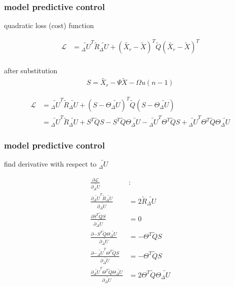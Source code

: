 \documentclass{beamer}
\begin{document}
\begin{frame}
  
  \frametitle{\bf model predictive control}

  quadratic loss (cost) function

  \begin{align*}
    \mathcal{L} &= \tilde{_\Delta U}^T \tilde{R} \tilde{_\Delta U} 
                + (\tilde{X_r} - \tilde{X})^T \tilde{Q} (\tilde{X_r} - \tilde{X})^T \\
  \end{align*}

  after substitution
  \begin{align*}
    S = \tilde{X_r} - \Psi\tilde{X} - \Omega u(n-1)
  \end{align*}


  \begin{align*}
    \mathcal{L} &= \tilde{_\Delta U}^T \tilde{R} \tilde{_\Delta U} + (S -  \Theta \tilde{_\Delta U} )^T \tilde{Q} (S -  \Theta \tilde{_\Delta U} ) \\
                &= \tilde{_\Delta U}^T \tilde{R} \tilde{_\Delta U} 
                + S^T\tilde{Q}S - S^T \tilde{Q} \Theta \tilde{_\Delta U} 
                - \tilde{_\Delta U}^T \Theta^T\tilde{Q}S + \tilde{_\Delta U}^T\Theta^T\tilde{Q}\Theta\tilde{_\Delta U}
  \end{align*}

\end{frame}



\begin{frame}
  
  \frametitle{\bf model predictive control}

  find derivative with respect to $\tilde{_\Delta U}$ 

  \begin{align*}
    \frac{\partial \mathcal{L}}{\partial {\tilde{_\Delta U}}} & : \\
    \frac{\partial {\tilde{_\Delta U}^T \tilde{R} \tilde{_\Delta U} } }{\partial {\tilde{_\Delta U}}} & = 2\tilde{R}\tilde{_\Delta U} \\
    \frac{\partial {S^T\tilde{Q}S}}{\partial {\tilde{_\Delta U}}} & = 0 \\
    \frac{\partial {- S^T \tilde{Q} \Theta \tilde{_\Delta U} }}{\partial {\tilde{_\Delta U}}} & = -\Theta^T\tilde{Q}S \\
    \frac{\partial {- \tilde{_\Delta U}^T \Theta^T\tilde{Q}S}}{\partial {\tilde{_\Delta U}}} & = -\Theta^T\tilde{Q}S \\
    \frac{\partial { \tilde{_\Delta U}^T\Theta^T\tilde{Q}\Theta\tilde{_\Delta U}}}{\partial {\tilde{_\Delta U}}} & = 2\Theta^T\tilde{Q}\Theta\tilde{_\Delta U}
  \end{align*}  

\end{frame}
\end{document}
